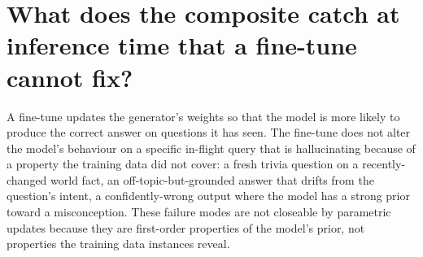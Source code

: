 
\section[What the composite catches]{What does the composite catch at inference time that a fine-tune cannot fix?}
\label{app:qa-composite-catches}

A fine-tune updates the generator's weights so that the model is more likely to produce the correct answer on questions it has seen. The fine-tune does not alter the model's behaviour on a specific in-flight query that is hallucinating because of a property the training data did not cover: a fresh trivia question on a recently-changed world fact, an off-topic-but-grounded answer that drifts from the question's intent, a confidently-wrong output where the model has a strong prior toward a misconception. These failure modes are not closeable by parametric updates because they are first-order properties of the model's prior, not properties the training data instances reveal.

